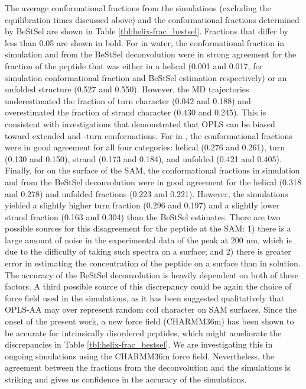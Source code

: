 The average conformational fractions from the simulations (excluding the equilibration times discussed above) and the conformational fractions determined by BeStSel are shown in Table \ref{tbl:helix-frac_bestsel}. 
Fractions that differ by less than 0.05 are shown in bold. 
For \pep{} in water, the conformational fraction in simulation and from the BeStSel deconvolution were in strong agreement for the fraction of the peptide that was either in a helical (0.001 and 0.017, for simulation conformational fraction and BeStSel estimation respectively) or an unfolded structure (0.527 and 0.550). 
However, the MD trajectories underestimated the fraction of turn character (0.042 and 0.188) and overestimated the fraction of strand character (0.430 and 0.245). 
This is consistent with investigations that demonstrated that OPLS can be biased toward extended and \textbeta{}-turn conformations\cite{Best2011, Smith2015}. 
For \pep{} in \tbawat{}, the conformational fractions were in good agreement for all four categories: helical (0.276 and 0.261), turn (0.130 and 0.150), strand (0.173 and 0.184), and unfolded (0.421 and 0.405). 
Finally, for \pep{} on the surface of the SAM, the conformational fractions in simulation and from the BeStSel deconvolution were in good agreement for the helical (0.318 and 0.278) and unfolded fractions (0.223 and 0.221). 
However, the simulations yielded a slightly higher turn fraction (0.296 and 0.197) and a slightly lower strand fraction (0.163 and 0.304) than the BeStSel estimates. 
There are two possible sources for this disagreement for the peptide at the SAM: 
1) there is a large amount of noise in the experimental data of the peak at 200 nm, which is due to the difficulty of taking such spectra on a surface; and 
2) there is greater error in estimating the concentration of the peptide on a surface than in solution. 
The accuracy of the BeStSel deconvolution is heavily dependent on both of these factors. 
A third possible source of this discrepancy could be again the choice of force field used in the simulations, as it has been suggested qualitatively that OPLS-AA may over represent random coil character on SAM surfaces\cite{Collier2012}. 
Since the onset of the present work, a new force field (CHARMM36m) has been shown to be accurate for intrinsically disordered peptides\cite{Huang2017}, which might ameliorate the discrepancies in Table \ref{tbl:helix-frac_bestsel}. 
We are investigating this in ongoing simulations using the CHARMM36m force field. 
Nevertheless, the agreement between the fractions from the deconvolution and the simulations is striking and gives us confidence in the accuracy of the simulations.

